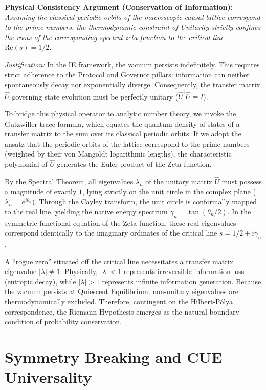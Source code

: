 \documentclass[11pt,aps,prd,twocolumn,nofootinbib,superscriptaddress]{revtex4-2}
\begin{document}
\textbf{Physical Consistency Argument (Conservation of Information):} \textit{Assuming the classical periodic orbits of the macroscopic causal lattice correspond to the prime numbers, the thermodynamic constraint of Unitarity strictly confines the roots of the corresponding spectral zeta function to the critical line $\text{Re}(s) = 1/2$.}

\textit{Justification:} In the IE framework, the vacuum persists indefinitely. This requires strict adherence to the Protocol and Governor pillars: information can neither spontaneously decay nor exponentially diverge. Consequently, the transfer matrix $\hat{U}$ governing state evolution must be perfectly unitary ($\hat{U}^\dagger \hat{U} = I$). 

To bridge this physical operator to analytic number theory, we invoke the Gutzwiller trace formula, which equates the quantum density of states of a transfer matrix to the sum over its classical periodic orbits. If we adopt the ansatz that the periodic orbits of the lattice correspond to the prime numbers (weighted by their von Mangoldt logarithmic lengths), the characteristic polynomial of $\hat{U}$ generates the Euler product of the Zeta function.

By the Spectral Theorem, all eigenvalues $\lambda_n$ of the unitary matrix $\hat{U}$ must possess a magnitude of exactly $1$, lying strictly on the unit circle in the complex plane ($\lambda_n = e^{i\theta_n}$). Through the Cayley transform, the unit circle is conformally mapped to the real line, yielding the native energy spectrum $\gamma_n = \tan(\theta_n / 2)$. In the symmetric functional equation of the Zeta function, these real eigenvalues correspond identically to the imaginary ordinates of the critical line $s = 1/2 + i\gamma_n$. 

A ``rogue zero'' situated off the critical line necessitates a transfer matrix eigenvalue $|\lambda| \neq 1$. Physically, $|\lambda| < 1$ represents irreversible information loss (entropic decay), while $|\lambda| > 1$ represents infinite information generation. Because the vacuum persists at Quiescent Equilibrium, non-unitary eigenvalues are thermodynamically excluded. Therefore, contingent on the Hilbert-P\'olya correspondence, the Riemann Hypothesis emerges as the natural boundary condition of probability conservation.

\section{Symmetry Breaking and CUE Universality}
\end{document}
